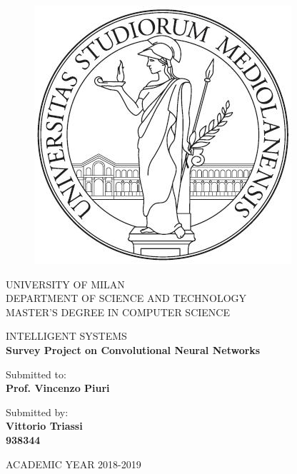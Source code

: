 \thispagestyle{empty}

\begin{figure}[h!]
    \centering
    \includegraphics[scale=0.35]{images/unimi.jpg}
    \label{fig:logo}
\end{figure}

\begin{center}
\large{UNIVERSITY OF MILAN}\vspace{2mm}\\
    \large{DEPARTMENT OF SCIENCE AND TECHNOLOGY}\vspace{2mm}\\
    \small{MASTER'S DEGREE IN COMPUTER SCIENCE}
\end{center}

\vspace{35mm}

\begin{center}
    \large{INTELLIGENT SYSTEMS}\vspace{2mm}\\
    \Large{\textbf{Survey Project on Convolutional Neural Networks}}\\
\end{center}

\vspace{40mm}

\begin{multicols}{2}
    \begin{flushleft}
        \large{Submitted to:}\vspace{1mm}\\
        \large{\textbf{Prof. Vincenzo Piuri}}\\
        \columnbreak
    \end{flushleft}
    \begin{flushright}
        \large{Submitted by:}\vspace{1mm}\\
        \large{\textbf{Vittorio Triassi}}\\
        \large{\textbf{938344}}\\
    \end{flushright}
\end{multicols}

\vspace{40mm}

\begin{center}
    ACADEMIC YEAR 2018-2019
\end{center}

\newpage